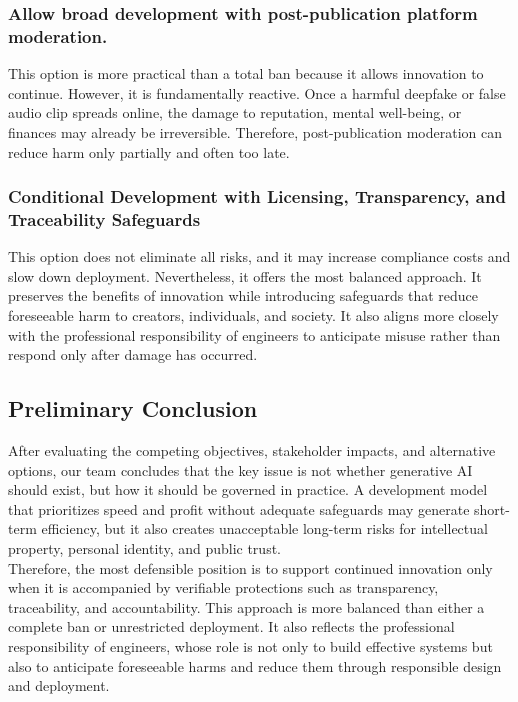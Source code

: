 \subsubsection{Allow broad development with post-publication platform moderation.}

This option is more practical than a total ban because it allows innovation to continue. However, it is fundamentally reactive. Once a harmful deepfake or false audio clip spreads online, the damage to reputation, mental well-being, or finances may already be irreversible. Therefore, post-publication moderation can reduce harm only partially and often too late.

\subsubsection{Conditional Development with Licensing, Transparency, and Traceability Safeguards}

This option does not eliminate all risks, and it may increase compliance costs and slow down deployment. Nevertheless, it offers the most balanced approach. It preserves the benefits of innovation while introducing safeguards that reduce foreseeable harm to creators, individuals, and society. It also aligns more closely with the professional responsibility of engineers to anticipate misuse rather than respond only after damage has occurred.

\subsection{Preliminary Conclusion}
After evaluating the competing objectives, stakeholder impacts, and alternative options, our team concludes that the key issue is not whether generative AI should exist, but how it should be governed in practice. A development model that prioritizes speed and profit without adequate safeguards may generate short-term efficiency, but it also creates unacceptable long-term risks for intellectual property, personal identity, and public trust. \\

Therefore, the most defensible position is to support continued innovation only when it is accompanied by verifiable protections such as transparency, traceability, and accountability. This approach is more balanced than either a complete ban or unrestricted deployment. It also reflects the professional responsibility of engineers, whose role is not only to build effective systems but also to anticipate foreseeable harms and reduce them through responsible design and deployment.
